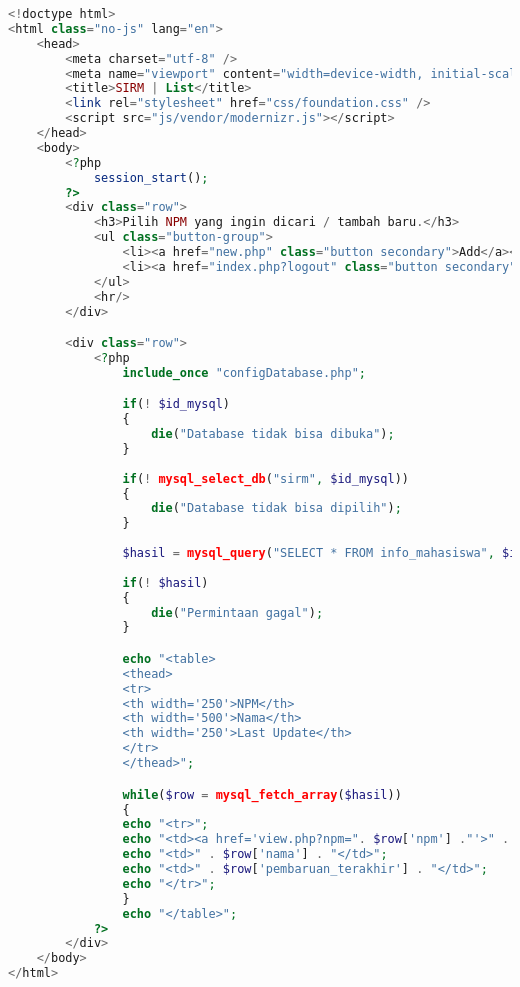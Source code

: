 \begin{lstlisting}[language=php,basicstyle=\tiny,caption=list.php]
<!doctype html>
<html class="no-js" lang="en">
	<head>
		<meta charset="utf-8" />
		<meta name="viewport" content="width=device-width, initial-scale=1.0" />
		<title>SIRM | List</title>
		<link rel="stylesheet" href="css/foundation.css" />
		<script src="js/vendor/modernizr.js"></script>
	</head>
	<body>
		<?php
			session_start();
		?>
		<div class="row">
			<h3>Pilih NPM yang ingin dicari / tambah baru.</h3>
			<ul class="button-group">
				<li><a href="new.php" class="button secondary">Add</a></li>
				<li><a href="index.php?logout" class="button secondary">Logout</a></li>
			</ul>
			<hr/>
		</div>

		<div class="row">
			<?php
				include_once "configDatabase.php";

				if(! $id_mysql)
				{
					die("Database tidak bisa dibuka");
				}
					
				if(! mysql_select_db("sirm", $id_mysql))
				{
					die("Database tidak bisa dipilih");
				}
			
				$hasil = mysql_query("SELECT * FROM info_mahasiswa", $id_mysql);
				
				if(! $hasil)
				{
					die("Permintaan gagal");
				}

				echo "<table>
				<thead>
				<tr>
				<th width='250'>NPM</th>
				<th width='500'>Nama</th>
				<th width='250'>Last Update</th>
				</tr>
				</thead>";

				while($row = mysql_fetch_array($hasil))
				{
				echo "<tr>";
				echo "<td><a href='view.php?npm=". $row['npm'] ."'>" . $row['npm'] . "</a></td>";
				echo "<td>" . $row['nama'] . "</td>";
				echo "<td>" . $row['pembaruan_terakhir'] . "</td>";
				echo "</tr>";
				}
				echo "</table>";
			?> 
		</div>
	</body>
</html>
\end{lstlisting}

